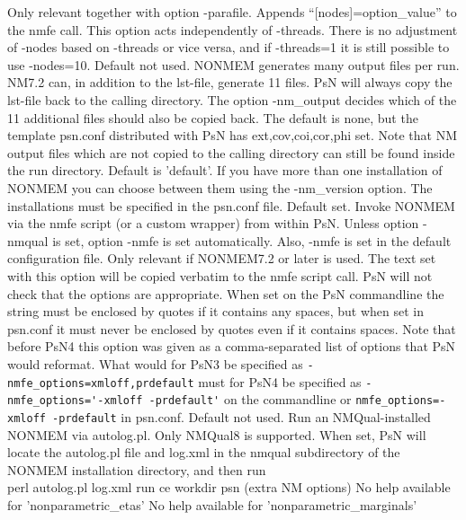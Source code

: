 \begin{optionlist}
\nextopt
{}
Only relevant together with option -parafile. Appends “[nodes]=option\_value” to the nmfe call. This option acts independently of -threads. There is no adjustment of -nodes based on -threads or vice versa, and if -threads=1 it is still possible to use -nodes=10. 
\nextopt
{}
Default not used.  NONMEM generates many output files per run. NM7.2 can, in addition to the lst-file, generate 11 files. PsN will always copy the lst-file back to the calling directory. The option -nm\_output decides which of the 11 additional files should also be copied back. The default is none, but the template psn.conf distributed with PsN has ext,cov,coi,cor,phi set. Note that NM output files which are not copied to the calling directory can still be found inside the run directory. 
\nextopt
{}
Default is 'default'. If you have more than one installation of NONMEM you can choose between them using the -nm\_version option. The installations must be specified in the psn.conf file. 
\nextopt
{}
Default set.
Invoke NONMEM via the nmfe script (or a custom wrapper) from within PsN. 
Unless option -nmqual is set, option -nmfe is 
set automatically. Also, -nmfe is set in the default configuration file.
\nextopt
{}
Only relevant if NONMEM7.2 or later is used. 
The text set with this option
will be copied verbatim to the nmfe script call. PsN will not check that the options are appropriate. When set on the PsN commandline the string must be enclosed 
by quotes if it contains any spaces, but when set in psn.conf it must never be enclosed by quotes even if it contains spaces. 
Note that before PsN4 this option was given as a comma-separated list of options that PsN would reformat. What would for PsN3 be specified as 
\verb|-nmfe_options=xmloff,prdefault| must for PsN4 be specified as \verb|-nmfe_options='-xmloff -prdefault'| on the commandline or 
\verb|nmfe_options=-xmloff -prdefault| in psn.conf.
\nextopt
{}
Default not used. Run an NMQual-installed NONMEM via autolog.pl. Only NMQual8 is supported. 
When set, PsN will locate the autolog.pl file and log.xml in the nmqual subdirectory of the NONMEM installation directory, and then run \\
perl autolog.pl log.xml run ce workdir psn (extra NM options)
\nextopt
{}
No help available for 'nonparametric\_etas' 
\nextopt
{}
No help available for 'nonparametric\_marginals' 

\end{optionlist}

